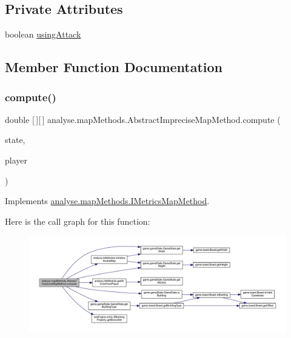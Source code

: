 \subsection*{Private Attributes}
\begin{DoxyCompactItemize}
\item 
boolean \mbox{\hyperlink{classanalyse_1_1map_methods_1_1_abstract_imprecise_map_method_a14956fa88bde1cf0654a3cf37c5b46be}{using\+Attack}}
\end{DoxyCompactItemize}


\subsection{Member Function Documentation}
\mbox{\label{classanalyse_1_1map_methods_1_1_abstract_imprecise_map_method_a05c258bdd82babbaad63b4a9a5bbb063}} 
\subsubsection{\texorpdfstring{compute()}{compute()}}
{\footnotesize\ttfamily double \mbox{[}$\,$\mbox{]}\mbox{[}$\,$\mbox{]} analyse.\+map\+Methods.\+Abstract\+Imprecise\+Map\+Method.\+compute (\begin{DoxyParamCaption}\item[{\mbox{\hyperlink{classgame_1_1game_state_1_1_game_state}{Game\+State}}}]{state,  }\item[{\mbox{\hyperlink{enumgame_1_1_e_player}{E\+Player}}}]{player }\end{DoxyParamCaption})\hspace{0.3cm}{\ttfamily [inline]}}



Implements \mbox{\hyperlink{interfaceanalyse_1_1map_methods_1_1_i_metrics_map_method_aef15b826032a8cc1140563d539dd1319}{analyse.\+map\+Methods.\+I\+Metrics\+Map\+Method}}.

Here is the call graph for this function\+:
\nopagebreak
\begin{figure}[H]
\begin{center}
\leavevmode
\includegraphics[width=350pt]{classanalyse_1_1map_methods_1_1_abstract_imprecise_map_method_a05c258bdd82babbaad63b4a9a5bbb063_cgraph}
\end{center}
\end{figure}


